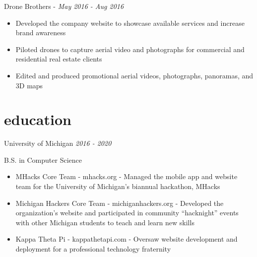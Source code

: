 \documentclass[]{template}
\begin{document}
\begin{entrylist}
\entry
{Drone Brothers  - }
{\textit{May 2016 - Aug 2016}}
{
\vspace{-10pt}
\begin{itemize}[leftmargin=10pt, itemsep=-9pt, topsep=2pt]
    \item Developed the company website to showcase available services and increase brand awareness\\
    \item Piloted drones to capture aerial video and photographs for commercial and residential real estate clients\\
    \item Edited and produced promotional aerial videos, photographs, panoramas, and 3D maps
\end{itemize}
}


\end{entrylist}


\vspace{-12pt}
\section{education}

\begin{entrylist}


\entry
{University of Michigan}
{\textit{2016 - 2020}}
{B.S. in Computer Science\\

\vspace{-8pt}
\begin{itemize}[leftmargin=10pt, itemsep=-9pt, topsep=2pt]
    \item MHacks Core Team - mhacks.org - Managed the mobile app and website team for the University of Michigan's biannual hackathon, MHacks\\
	\item Michigan Hackers Core Team - michiganhackers.org - Developed the organization's website and participated in community ``hacknight'' events with other Michigan students to teach and learn new skills\\
	\item Kappa Theta Pi - kappathetapi.com - Oversaw website development and deployment for a professional technology fraternity
\end{itemize}}


\end{entrylist}
\end{document}
